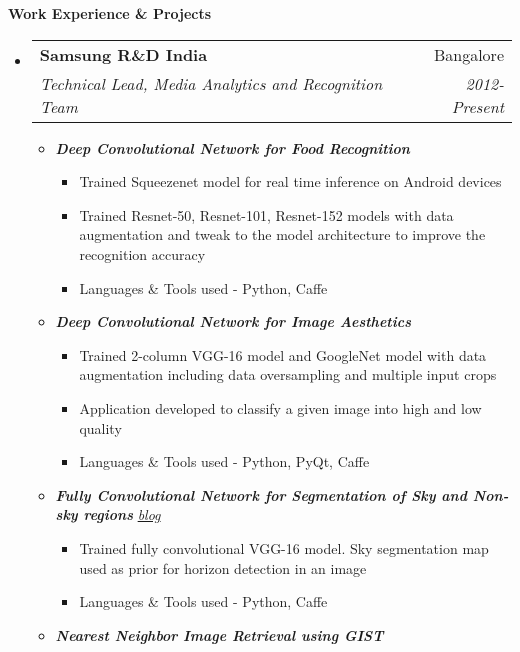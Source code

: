 \documentclass[letterpaper,11pt]{article}
\makeatletter
\newcommand{\resitem}[1]{\item #1 \vspace{-2pt}}
\newcommand{\resheading}[1]{{\large \colorbox{mygrey}{\begin{minipage}{\textwidth}{\textbf{#1 \vphantom{p\^{E}}}}\end{minipage}}}}
\newcommand{\ressubheading}[4]{
	\begin{tabular*}{7.0in}{l@{\extracolsep{\fill}}r}
		\textbf{#1} & #2 \\
		\textit{#3} & \textit{#4} \\
	\end{tabular*}\vspace{-6pt}}
\makeatother
\begin{document}
\resheading{Work Experience \& Projects}
\begin{itemize}
	\item
		\ressubheading{Samsung R\&D India}{Bangalore}{Technical Lead, Media Analytics and Recognition Team}{2012-Present}
		\vspace{4mm}
		\begin{itemize}
				\resitem[]{\faCircleO
					\hspace{1mm}\textbf{\emph{Deep Convolutional Network for Food Recognition}}\hspace{1mm}}
				\begin{itemize}
						\resitem{Trained Squeezenet model for real time inference on Android devices}
						\resitem{Trained Resnet-50, Resnet-101, Resnet-152 models with data augmentation and tweak to the model architecture to improve the recognition accuracy}
						\resitem{Languages \& Tools used - Python, Caffe}
				\end{itemize}
				\vspace{2.5mm}
				\resitem[]{\faCircleO
					\hspace{1mm}\textbf{\emph{Deep Convolutional Network for Image Aesthetics}}\hspace{1mm}}
				\begin{itemize}
						\resitem{Trained 2-column VGG-16 model and GoogleNet model with data augmentation including data oversampling and multiple input crops}
						\resitem{Application developed to classify a given image into high and low quality}
						\resitem{Languages \& Tools used - Python, PyQt, Caffe}
				\end{itemize}
				\vspace{2.5mm}
				\resitem[]{\faCircleO
					\hspace{1mm}\textbf{\emph{Fully Convolutional Network for Segmentation of Sky and Non-sky regions}}\hspace{1mm}
					\faGlobe \hspace{1mm} \href{https://nrupatunga.github.io/fcn-segmentation/}{\emph{blog}}}
				\begin{itemize}
						\resitem{Trained fully convolutional VGG-16 model. Sky segmentation map used as prior for horizon detection in an image}
						\resitem{Languages \& Tools used - Python, Caffe}
				\end{itemize}
				\vspace{2.5mm}
				\resitem[]{\faCircleO \hspace{1mm}\textbf{\emph{Nearest Neighbor Image Retrieval using GIST}}\hspace{1mm}
}
\end{itemize}
\end{itemize}
\end{document}
